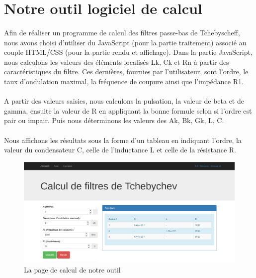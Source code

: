 \documentclass[a4paper,11pt]{article}
\begin{document}
    \clearpage{}

    \section{Notre outil logiciel de calcul}
        \paragraph{}
Afin de réaliser un programme de calcul des filtres passe-bas de Tchebyscheff,
nous avons choisi d’utiliser du JavaScript (pour la partie traitement) associé au couple HTML/CSS (pour la partie rendu et affichage).
Dans la partie JavaScript, nous calculons les valeurs des éléments localisés Lk, Ck et Rn à partir des caractéristiques du filtre.
Ces dernières, fournies par l'utilisateur, sont l’ordre, le taux d’ondulation maximal, la fréquence de coupure ainsi que l’impédance R1.
        \paragraph{}
A partir des valeurs saisies, nous calculons la pulsation, la valeur de beta et de gamma,
ensuite la valeur de R en appliquant la bonne formule selon si l’ordre est pair ou impair.
Puis nous déterminons les valeurs des Ak, Bk, Gk, L, C.
        \paragraph{}
Nous affichons les résultats sous la forme d’un tableau en indiquant l’ordre,
la valeur du condensateur C, celle de l’inductance L et celle de la résistance R.
    \\
    \begin{figure}[h]
        \begin{center}
            \includegraphics[scale=0.3]{images/filtres/screen-site.png}
        \end{center}
            \caption{ La page de calcul de notre outil }
            \label{La page de calcul de notre outil de calcul de filtres de Tchebyscheff}
    \end{figure}
\end{document}
